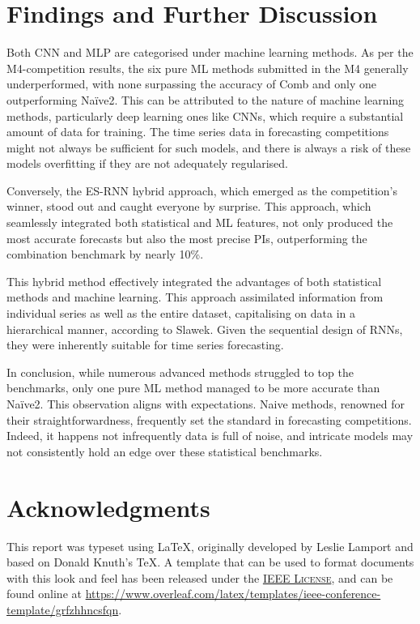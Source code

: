 \documentclass[conference]{IEEEtran}
\begin{document}
\section{Findings and Further Discussion}

Both CNN and MLP are categorised under machine learning methods. As per the M4-competition results\cite{m4-resutls}, the six pure ML methods submitted in the M4 generally underperformed, with none surpassing the accuracy of Comb and only one outperforming Naïve2. This can be attributed to the nature of machine learning methods, particularly deep learning ones like CNNs, which require a substantial amount of data for training. The time series data in forecasting competitions might not always be sufficient for such models, and there is always a risk of these models overfitting if they are not adequately regularised.

Conversely, the ES-RNN hybrid approach, which emerged as the competition's winner, stood out and caught everyone by surprise. This approach, which seamlessly integrated both statistical and ML features, not only produced the most accurate forecasts but also the most precise PIs, outperforming the combination benchmark by nearly 10\%.

This hybrid method effectively integrated the advantages of both statistical methods and machine learning. This approach assimilated information from individual series as well as the entire dataset, capitalising on data in a hierarchical manner, according to Slawek\cite{slawek}. Given the sequential design of RNNs, they were inherently suitable for time series forecasting.

In conclusion, while numerous advanced methods struggled to top the benchmarks, only one pure ML method managed to be more accurate than Naïve2. This observation aligns with expectations. Naive methods, renowned for their straightforwardness, frequently set the standard in forecasting competitions. Indeed, it happens not infrequently data is full of noise, and intricate models may not consistently hold an edge over these statistical benchmarks.


\section*{Acknowledgments}

This report was typeset using \LaTeX, originally developed by Leslie Lamport and based on Donald Knuth's \TeX. A template that can be used to format documents with this look and feel has been released under the \href{https://www.ieee.org/publications/subscriptions/info/licensing.html}{\textsc{IEEE License}}, and can be found online at \url{https://www.overleaf.com/latex/templates/ieee-conference-template/grfzhhncsfqn}.
\end{document}
